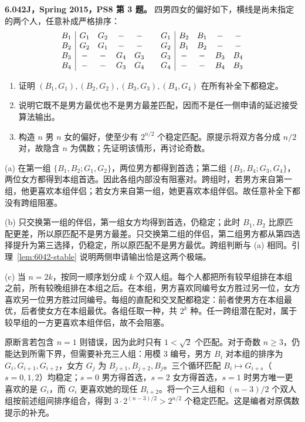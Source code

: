 \begin{exercise}\label{mit:6042-ps8-q3}
\textbf{6.042J，Spring 2015，PS8 第 3 题。}
四男四女的偏好如下，横线是尚未指定的两个人，任意补成严格排序：
\[
\begin{array}{c|cccc@{\qquad}c|cccc}
B_1&G_1&G_2&-&-&G_1&B_2&B_1&-&-\\
B_2&G_2&G_1&-&-&G_2&B_1&B_2&-&-\\
B_3&-&-&G_4&G_3&G_3&-&-&B_3&B_4\\
B_4&-&-&G_3&G_4&G_4&-&-&B_4&B_3
\end{array}
\]
\begin{enumerate}[label=(\alph*)]
\item 证明 $(B_1,G_1),(B_2,G_2),(B_3,G_3),(B_4,G_4)$ 在所有补全下都稳定。
\item 说明它既不是男方最优也不是男方最差匹配，因而不是任一侧申请的延迟接受算法输出。
\item 构造 $n$ 男 $n$ 女的偏好，使至少有 $2^{n/2}$ 个稳定匹配。原提示将双方各分成 $n/2$ 对，故隐含 $n$ 为偶数；先证明该情形，再讨论奇数。
\end{enumerate}
\end{exercise}
\begin{solution}
(a) 在第一组 $\{B_1,B_2;G_1,G_2\}$，两位男方都得到首选；第二组 $\{B_3,B_4;G_3,G_4\}$，两位女方都得到本组首选。因此各组内部没有阻塞对。跨组时，若男方来自第一组，他更喜欢本组伴侣；若女方来自第一组，她更喜欢本组伴侣。故任意补全下都没有跨组阻塞。

(b) 只交换第一组的伴侣，第一组女方均得到首选，仍稳定；此时 $B_1,B_2$ 比原匹配更差，所以原匹配不是男方最差。只交换第二组的伴侣，第二组男方都从第四选择提升为第三选择，仍稳定，所以原匹配不是男方最优。跨组判断与 (a) 相同。引理~\ref{lem:6042-stable} 说明两侧申请输出恰是这两个极端。

(c) 当 $n=2k$，按同一顺序划分成 $k$ 个双人组。每个人都把所有较早组排在本组之前，所有较晚组排在本组之后。在本组，男方喜欢同编号女方胜过另一位，女方喜欢另一位男方胜过同编号。每组的直配和交叉配都稳定：前者使男方在本组最优，后者使女方在本组最优。各组任取一种，共 $2^k$ 种。任一跨组潜在配对，属于较早组的一方更喜欢本组伴侣，故不会阻塞。

原断言若包含 $n=1$ 则错误，因为此时只有 $1<\sqrt2$ 个匹配。对于奇数 $n\ge3$，仍能达到所需下界，但需要补充三人组：用模 $3$ 编号，男方 $B_i$ 对本组的排序为 $G_i,G_{i+1},G_{i+2}$，女方 $G_j$ 为 $B_{j+1},B_{j+2},B_j$。三个循环匹配 $B_i\mapsto G_{i+s}$（$s=0,1,2$）均稳定；$s=0$ 男方得首选，$s=2$ 女方得首选，$s=1$ 时男方唯一更喜欢的是 $G_i$，而 $G_i$ 更喜欢她的现任 $B_{i+2}$。将一个三人组和 $(n-3)/2$ 个双人组按前述组间排序组合，得到 $3\cdot2^{(n-3)/2}>2^{n/2}$ 个稳定匹配。这是编者对原偶数提示的补充。
\end{solution}

